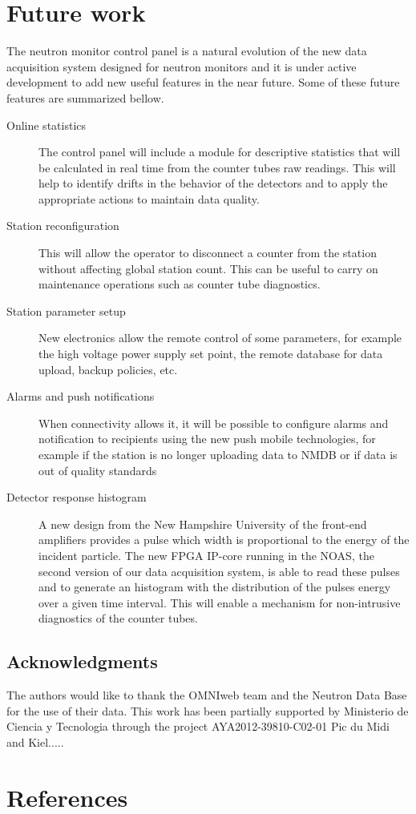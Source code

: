 \documentclass[a4paper]{jpconf}
\begin{document}
\section{Future work}

The neutron monitor control panel is a natural evolution of the new data
acquisition system designed for neutron monitors and it is under active
development to add new useful features in the near future. Some of these future
features are summarized bellow.

\begin{description}
    \item[Online statistics] The control panel will include a module for
        descriptive statistics that will be calculated in real time from the
        counter tubes raw readings. This will help to identify drifts in the
        behavior of the detectors and to apply the appropriate actions to
        maintain data quality.
    \item[Station reconfiguration] This will allow the operator to disconnect a
        counter from the station without affecting global station count. This
        can be useful to carry on maintenance operations such as counter tube
        diagnostics. 
    \item[Station parameter setup] New electronics allow the remote control of
        some parameters, for example the high voltage power supply set point,
        the remote database for data upload, backup policies, etc.
    \item[Alarms and push notifications] When connectivity allows it, it will
        be possible to configure alarms and notification to recipients using
        the new push mobile technologies, for example if the station is no
        longer uploading data to NMDB or if data is out of quality standards
    \item[Detector response histogram] A new design from the New
        Hampshire University of the front-end amplifiers provides a pulse which
        width is proportional to the energy of the incident particle. The new
        FPGA IP-core running in the NOAS, the second version of our data
        acquisition system, is able to read these pulses and to generate an
        histogram with the distribution of the pulses energy over a given time
        interval. This will enable a mechanism for non-intrusive diagnostics of
        the counter tubes. 
\end{description}


\subsection*{Acknowledgments} 
The authors would like to thank the OMNIweb team and the Neutron
Data Base for the use of their data. This work has been partially supported by
Ministerio de Ciencia y Tecnologia through the project AYA2012-39810-C02-01
Pic du Midi and Kiel.....



\section*{References}
 
\end{document}
